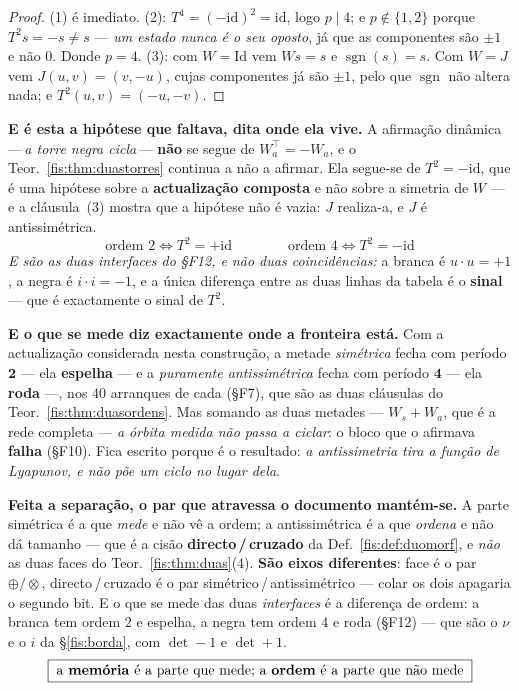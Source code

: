 \documentclass[livro.tex]{subfiles}
\begin{document}
\begin{proof}
(1) é imediato. (2): $T^{4}=(-\mathrm{id})^{2}=\mathrm{id}$, logo $p\mid4$; e
$p\notin\{1,2\}$ porque $T^{2}s=-s\neq s$ --- \emph{um estado nunca é o seu
oposto}, já que as componentes são $\pm1$ e não $0$. Donde $p=4$. (3): com
$W=\mathrm{Id}$ vem $Ws=s$ e $\operatorname{sgn}(s)=s$. Com $W=J$ vem
$J(u,v)=(v,-u)$, cujas componentes já são $\pm1$, pelo que $\operatorname{sgn}$
não altera nada; e $T^{2}(u,v)=(-u,-v)$.
\end{proof}

\medskip\noindent\textbf{E é esta a hipótese que faltava, dita onde ela vive.} A
afirmação dinâmica ---\,\emph{a torre negra cicla}\,--- \textbf{não} se segue de
$W_a^{\!\top}=-W_a$, e o Teor.~\ref{fis:thm:duastorres} continua a não a afirmar.
Ela segue-se de $T^{2}=-\mathrm{id}$, que é uma hipótese sobre a
\textbf{actualização composta} e não sobre a simetria de $W$ --- e a cláusula~(3)
mostra que a hipótese não é vazia: $J$ realiza-a, e $J$ é antissimétrica.
\[
\boxed{\;\text{ordem }2\iff T^{2}=+\mathrm{id}
\qquad\qquad
\text{ordem }4\iff T^{2}=-\mathrm{id}\;}
\]
\emph{E são as duas interfaces do §F12, e não duas coincidências:} a branca é
$u\cdot u=+1$, a negra é $i\cdot i=-1$, e a única diferença entre as duas linhas
da tabela é o \textbf{sinal} --- que é exactamente o sinal de $T^{2}$.

\medskip\noindent\textbf{E o que se mede diz exactamente onde a fronteira está.}
Com a actualização considerada nesta construção, a metade \emph{simétrica} fecha
com período $\mathbf{2}$ --- ela \textbf{espelha} --- e a \emph{puramente
antissimétrica} fecha com período $\mathbf{4}$ --- ela \textbf{roda} ---, nos
$40$ arranques de cada (§F7), que são as duas cláusulas do
Teor.~\ref{fis:thm:duasordens}. Mas somando as
duas metades --- $W_s+W_a$, que é a rede completa --- \emph{a órbita medida não
passa a ciclar}: o bloco que o afirmava \textbf{falha} (§F10). Fica escrito
porque é o resultado: \emph{a antissimetria tira a função de Lyapunov, e não põe
um ciclo no lugar dela}.

\medskip\noindent\textbf{Feita a separação, o par que atravessa o documento
mantém-se.} A parte simétrica é a que \emph{mede} e não vê a ordem; a
antissimétrica é a que \emph{ordena} e não dá tamanho --- que é a cisão
\textbf{directo\,/\,cruzado} da Def.~\ref{fis:def:duomorf}, e \emph{não} as duas
faces do Teor.~\ref{fis:thm:duas}(4). \textbf{São eixos diferentes}: face é o par
$\oplus/\otimes$, directo\,/\,cruzado é o par simétrico\,/\,antissimétrico ---
colar os dois apagaria o segundo bit. E o que se mede das duas \emph{interfaces}
é a diferença de ordem: a branca tem ordem $2$ e espelha, a negra tem ordem $4$ e
roda (§F12) --- que são o $\nu$ e o $i$ da §\ref{fis:borda}, com $\det-1$ e
$\det+1$.
\[
\boxed{\;\text{a \textbf{memória} é a parte que mede; a \textbf{ordem} é a parte
que não mede}\;}
\]
\end{document}
